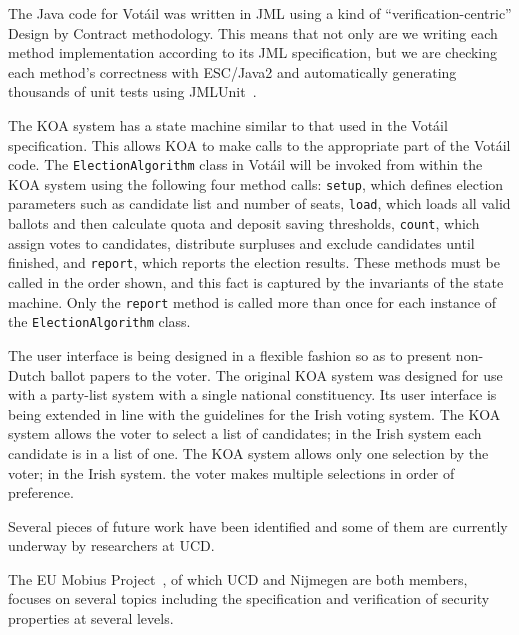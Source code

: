 \documentclass[times, 10pt, twocolumn]{article}
\newcommand{\Votail}{Vot{\'a}il\xspace}
\begin{document}
The Java code for \Votail was written in JML using a kind of 
``verification-centric'' Design by Contract methodology.  This means that not 
only are we writing each method implementation according to its JML 
specification, but we are checking each method's correctness with ESC/Java2 and 
automatically generating thousands of unit tests using 
JMLUnit~\cite{Cheon-Leavens02}.

The KOA system has a state machine similar to that used in the \Votail 
specification.  This allows KOA to make calls to the appropriate part of the 
\Votail code.  The \texttt{ElectionAlgorithm} class in \Votail will be invoked 
from within the KOA system using the following four method calls: 
\texttt{setup}, which defines election parameters such as candidate list and 
number of seats, \texttt{load}, which loads all valid ballots and then 
calculate quota and deposit saving thresholds, \texttt{count}, which assign 
votes to candidates, distribute surpluses and exclude candidates until finished, and \texttt{report}, which reports the election results.  These methods 
must be called in the order shown, and this fact is captured by the invariants 
of the state machine.  Only the \texttt{report} method is called more than once 
for each instance of the \texttt{ElectionAlgorithm} class.

The user interface is being designed in a flexible fashion so as to present 
non-Dutch ballot papers to the voter.  The original KOA system was designed for 
use with a party-list system with a single national constituency.  Its user 
interface is being extended in line with the guidelines for the Irish voting 
system.  The KOA system allows the voter to select a list of candidates; in the 
Irish system each candidate is in a list of one.  The KOA system allows only 
one selection by the voter; in the Irish system. the voter makes multiple 
selections in order of preference.

\label{sec:future-work}

Several pieces of future work have been identified and some of them
are currently underway by researchers at UCD.


The EU Mobius Project~\cite{MOBIUS}, of which UCD and Nijmegen are
both members, focuses on several topics including the specification
and verification of security properties at several levels.
\end{document}

